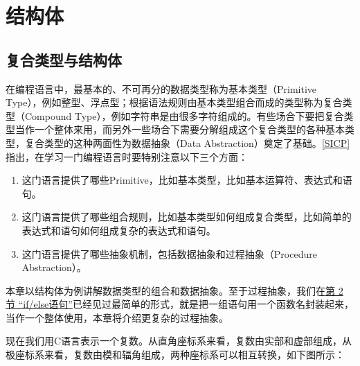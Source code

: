 

\chapter{结构体}
%





\section{复合类型与结构体}
%
在编程语言中，最基本的、不可再分的数据类型称为基本类型（Primitive Type），例如整型、浮点型；根据语法规则由基本类型组合而成的类型称为复合类型（Compound Type），例如字符串是由很多字符组成的。有些场合下要把复合类型当作一个整体来用，而另外一些场合下需要分解组成这个复合类型的各种基本类型，复合类型的这种两面性为数据抽象（Data Abstraction）奠定了基础。\hyperlink{db.bi01.bibli.sicp}{[SICP]}指出，在学习一门编程语言时要特别注意以下三个方面：


\begin{enumerate}

\item 这门语言提供了哪些Primitive，比如基本类型，比如基本运算符、表达式和语句。

\item 这门语言提供了哪些组合规则，比如基本类型如何组成复合类型，比如简单的表达式和语句如何组成复杂的表达式和语句。

\item 这门语言提供了哪些抽象机制，包括数据抽象和过程抽象（Procedure Abstraction）。
\end{enumerate}


本章以结构体为例讲解数据类型的组合和数据抽象。至于过程抽象，我们在\hyperlink{db.ch04s02.id2718511}{第 2 节 “if/\BookSplit{}else语句”}已经见过最简单的形式，就是把一组语句用一个函数名封装起来，当作一个整体使用，本章将介绍更复杂的过程抽象。



现在我们用C语言表示一个复数。从直角座标系来看，复数由实部和虚部组成，从极座标系来看，复数由模和辐角组成，两种座标系可以相互转换，如下图所示：


